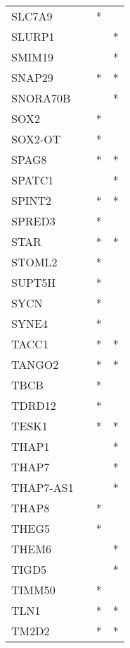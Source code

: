 \begin{longtable}{lccc}
SLC7A9       &           &   * &         \\
SLURP1       &           &     &       * \\
SMIM19       &           &     &       * \\
SNAP29       &           &   * &       * \\
SNORA70B     &           &     &       * \\
SOX2         &           &   * &         \\
SOX2-OT      &           &   * &         \\
SPAG8        &           &   * &       * \\
SPATC1       &           &     &       * \\
SPINT2       &           &   * &       * \\
SPRED3       &           &   * &         \\
STAR         &           &   * &       * \\
STOML2       &           &   * &         \\
SUPT5H       &           &   * &         \\
SYCN         &           &   * &         \\
SYNE4        &           &   * &         \\
TACC1        &           &   * &       * \\
TANGO2       &           &   * &       * \\
TBCB         &           &   * &         \\
TDRD12       &           &   * &         \\
TESK1        &           &   * &       * \\
THAP1        &           &     &       * \\
THAP7        &           &     &       * \\
THAP7-AS1    &           &     &       * \\
THAP8        &           &   * &         \\
THEG5        &           &   * &         \\
THEM6        &           &     &       * \\
TIGD5        &           &     &       * \\
TIMM50       &           &   * &         \\
TLN1         &           &   * &       * \\
TM2D2        &           &   * &       * \\

\end{longtable}
